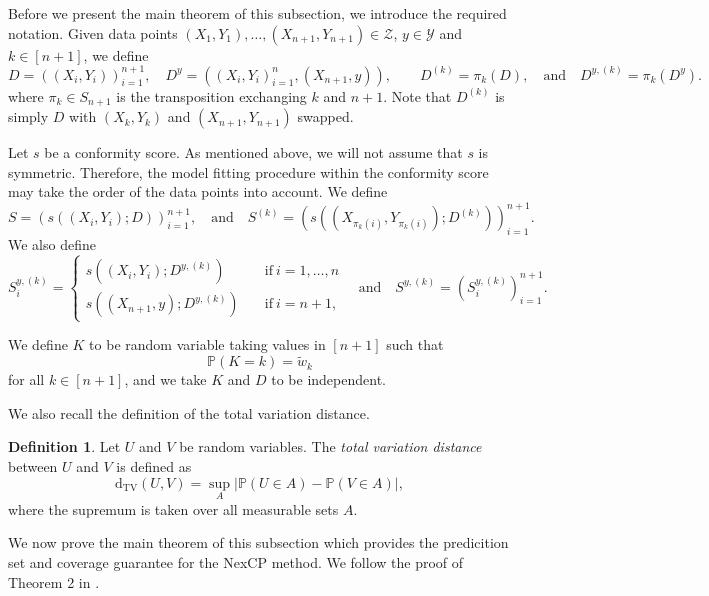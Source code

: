 \documentclass[11pt, titlepage]{article} %
\newcommand{\R}{\mathrm}
\newcommand{\Prob}[1]{\mathbb{P}\left( #1 \right)}
\numberwithin{equation}{section}
\theoremstyle{definition}
\newtheorem{definition}{Definition}
\numberwithin{theorem}{section}
\numberwithin{lemma}{section}
\numberwithin{corollary}{section}
\numberwithin{proposition}{section}
\numberwithin{definition}{section}
\numberwithin{remark}{section}
\begin{document}
\noindent
Before we present the main theorem of this subsection, we introduce the required notation. Given data points \((X_1, Y_1), \ldots, (X_{n+1}, Y_{n+1}) \in \mathcal{Z}\), \(y \in \mathcal{Y}\) and \(k \in [n+1]\), we define \[D = ((X_i, Y_i))_{i=1}^{n+1}, \quad D^{y} = ((X_i, Y_i)_{i=1}^n, (X_{n+1}, y)), \quad \quad D^{(k)} = \pi_k(D), \quad \mathrm{and} \quad D^{y, (k)} = \pi_k(D^{y}). \] where \(\pi_k \in S_{n+1}\) is the transposition exchanging \(k\) and \(n+1\). Note that \(D^{(k)}\) is simply \(D\) with \((X_k, Y_k)\) and \((X_{n+1}, Y_{n+1})\) swapped.
\vskip5pt

\noindent
Let \(s\) be a conformity score. As mentioned above, we will not assume that \(s\) is symmetric. Therefore, the model fitting procedure within the conformity score may take the order of the data points into account. We define \[S = (s((X_i, Y_i); D))_{i=1}^{n+1}, \quad \mathrm{and} \quad S^{(k)} = ( s(( X_{\pi_k(i)}, Y_{\pi_k(i)} ); D^{(k)}) )_{i=1}^{n+1}.\] We also define \[S_i^{y, (k)} = \begin{cases}
    s(( X_i, Y_i ); D^{y, (k)}) \quad &\mathrm{if} \ i = 1, \ldots, n \\
    s(( X_{n+1}, y ); D^{y, (k)}) \quad &\mathrm{if} \ i = n+1,
\end{cases} \quad \mathrm{and} \quad S^{y, (k)} = (S_i^{y,(k)})_{i=1}^{n+1}.\]

\noindent
We define \(K\) to be random variable taking values in \([n+1]\) such that \begin{equation}
    \Prob{K = k} = \tilde{w}_k
\label{eqn:nexCP_K_defn}
\end{equation} for all \(k \in [n+1]\), and we take \(K\) and \(D\) to be independent. \vskip5pt

\noindent
We also recall the definition of the total variation distance.

\begin{definition}
    Let \(U\) and \(V\) be random variables. The \textit{total variation distance} between \(U\) and \(V\) is defined as \[\R{d_{TV}}(U,V) = \sup_{A} | \Prob{U \in A} - \Prob{V \in A}|, \] where the supremum is taken over all measurable sets \(A\). 
\label{defn:TV_distance}
\end{definition}

\noindent
We now prove the main theorem of this subsection which provides the predicition set and coverage guarantee for the NexCP method. We follow the proof of Theorem 2 in \cite{barber2023conformalbeyondexch}.
\end{document}
